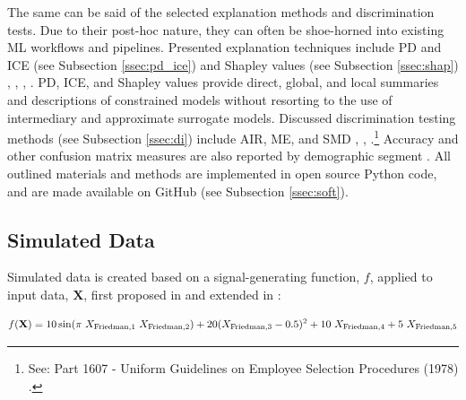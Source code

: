 \documentclass[information,article,submit,moreauthors,pdftex]{definitions/mdpi}
\begin{document}
The same can be said of the selected explanation methods and discrimination tests. Due to their post-hoc nature, they can often be shoe-horned into existing ML workflows and pipelines. Presented explanation techniques include PD and ICE (see Subsection \ref{ssec:pd_ice}) and Shapley values (see Subsection \ref{ssec:shap}) \cite{esl}, \cite{ice_plots}, \cite{shapley}, \cite{tree_shap}. PD, ICE, and Shapley values provide direct, global, and local summaries and descriptions of constrained models without resorting to the use of intermediary and approximate surrogate models. Discussed discrimination testing methods (see Subsection \ref{ssec:di}) include AIR, ME, and SMD \cite{feldman2015certifying}, \cite{cohen1988statistical}, \cite{cohen1992power}.\footnote{See: Part 1607 - Uniform Guidelines on Employee Selection Procedures (1978) .} Accuracy and other confusion matrix measures are also reported by demographic segment \cite{zafar2017fairness}. All outlined materials and methods are implemented in open source Python code, and are made available on GitHub (see Subsection \ref{ssec:soft}). 


\subsection{Simulated Data}\label{ssec:sim_data}

Simulated data is created based on a signal-generating function, $f$, applied to input data, $\mathbf{X}$, first proposed in \citet{friedman1979tree} and extended in \citet{friedman1991multivariate}:

\begin{equation}
\begin{aligned}\label{eq:sim}\small
f(\mathbf{X}) = 10\sin(\pi~X_{\text{Friedman},1}~X_{\text{Friedman},2}) + 20(X_{\text{Friedman},3} - 0.5)^2 + 10~X_{\text{Friedman},4} + 5~X_{\text{Friedman},5}
\end{aligned}
\end{equation}
\end{document}
